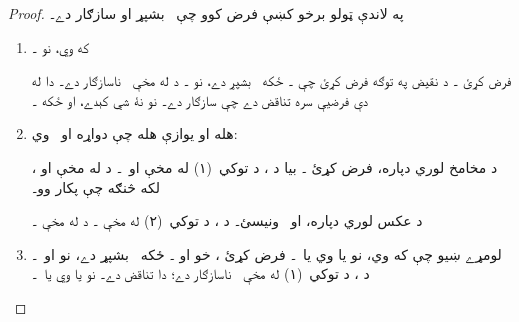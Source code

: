 \documentclass[12pt,a4paper,oneside]{report}
\theoremstyle{definition}
\begin{document}
\label{olpseg:OLP-0129-B015:start}
\begin{proof}
په لاندې ټولو برخو کښې فرض کوو چې~\LR{$\Gamma$} بشپړ او
سازګار دے۔
\begin{enumerate}
\item که  وي، نو ۔
\label{olpseg:OLP-0129-B015:end}

\label{olpseg:OLP-0129-B016:start}
فرض کړئ ۔ د نقيض په توګه فرض کړئ چې
۔ ځکه~\LR{$\Gamma$} بشپړ دے، نو
۔ د
%
له مخې~\LR{$\Gamma$} ناسازګار دے۔ دا له دې فرضيې سره تناقض دے چې
\LR{$\Gamma$} سازګار دے۔ نو  نۀ شي کېدے، او ځکه
۔
\label{olpseg:OLP-0129-B016:end}

\label{olpseg:OLP-0129-B017:start}
\item %
%
 هله او يوازې هله چې دواړه
 او~ وي:
\label{olpseg:OLP-0129-B017:end}

\label{olpseg:OLP-0129-B018:start}
د مخامخ لوري دپاره، فرض کړئ ۔ بيا د
%
  ، د توکي~(۱) له
مخې  او~۔ د
 له مخې  او
، لکه څنګه چې پکار وو۔
\label{olpseg:OLP-0129-B018:end}

\label{olpseg:OLP-0129-B019:start}
د عکس لوري دپاره،  او~ ونيسئ۔ د
%
  ، د توکي~(۲) له
مخې ۔ د
 له مخې ۔
\label{olpseg:OLP-0129-B019:end}

\label{olpseg:OLP-0129-B020:start}
\item %
%
لومړے ښيو چې که  وي، نو يا
 وي يا~۔ فرض کړئ
، خو  او
۔ ځکه~\LR{$\Gamma$} بشپړ دے، نو
 او~۔ د
%
  ، د توکي~(۱) له
مخې~\LR{$\Gamma$} ناسازګار دے؛ دا تناقض دے۔ نو يا
 وي يا~۔
\label{olpseg:OLP-0129-B020:end}


\end{enumerate}
\end{proof}
\end{document}

